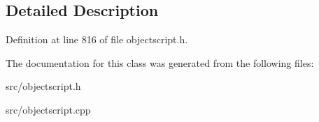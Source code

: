 \subsection{Detailed Description}


Definition at line 816 of file objectscript.\+h.



The documentation for this class was generated from the following files\+:\begin{DoxyCompactItemize}
\item 
src/objectscript.\+h\item 
src/objectscript.\+cpp\end{DoxyCompactItemize}
